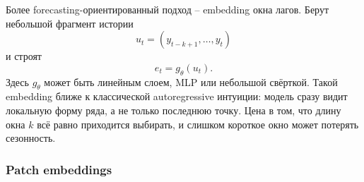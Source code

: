 \documentclass[12pt,fleqn]{article}
\begin{document}
Более forecasting-ориентированный подход -- embedding окна лагов.
Берут небольшой фрагмент истории
\begin{equation}
  u_t = (y_{t-k+1}, \ldots, y_t)
\end{equation}
и строят
\begin{equation}
  e_t = g_\theta(u_t).
\end{equation}
Здесь $g_\theta$ может быть линейным слоем, MLP или небольшой свёрткой.
Такой embedding ближе к классической autoregressive интуиции: модель сразу видит локальную форму ряда, а не только последнюю точку.
Цена в том, что длину окна $k$ всё равно приходится выбирать, и слишком короткое окно может потерять сезонность.

\subsubsection{Patch embeddings}
\end{document}
